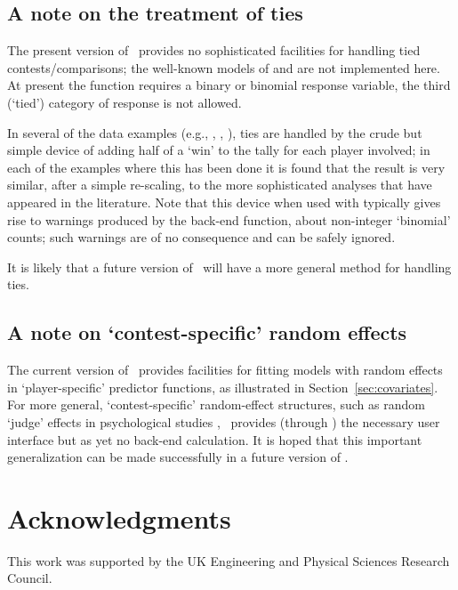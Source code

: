 \subsection[A note on the treatment of ties]{A note on the treatment of ties}

The present version of \BT\ provides no sophisticated facilities for handling
tied contests/comparisons; the well-known models of \cite{rao:kupp:67}
and \cite{davi:70} are not implemented here.  At present the 
function requires a binary or binomial response variable, the third (`tied')
category of response is not allowed.

In several of the data examples (e.g., , ,
),
ties are handled by the crude but simple device of adding half of a `win' to
the tally for each player involved;
in each of the examples where this has been done it is found that the
result is very similar, after a simple re-scaling, to the more
sophisticated analyses that have appeared in the literature.  Note that this
device when used with  typically gives rise to warnings
produced by the back-end
 function, about non-integer `binomial' counts; such warnings
are of no consequence and can be safely ignored.

It is likely that a future version of \BT\ will have a more general
method for handling ties.

\subsection{A note on `contest-specific' random effects}

The current version of \BT\ provides facilities for fitting models with
random effects in `player-specific' predictor functions, as illustrated
in Section~\ref{sec:covariates}.
For more general, `contest-specific' random-effect structures,
such as random `judge'
effects in psychological studies \citep[e.g.,][]{bock:01}, \BT\ provides
(through ) the necessary user interface but as yet no
back-end calculation.  It is hoped that this important generalization
can be made successfully in a future version of \BT.

\section*{Acknowledgments}

This work was supported by the UK Engineering and Physical Sciences Research
Council.


